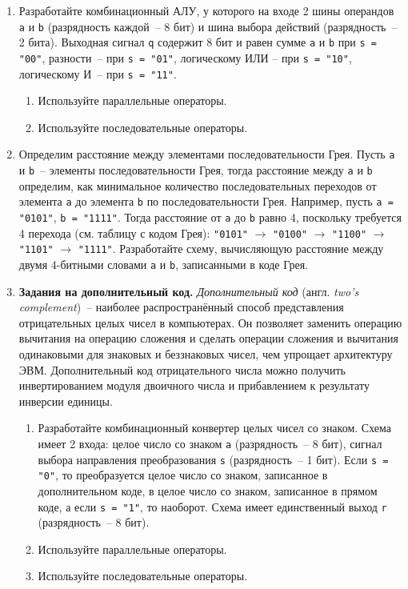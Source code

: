 \begin{enumerate}
\item Разработайте комбинационный АЛУ, у которого на входе 2 шины операндов \lstinline?a? и \lstinline?b? (разрядность каждой~-- 8 бит) и шина выбора действий (разрядность~-- 2 бита). Выходная сигнал \lstinline?q? содержит 8 бит и равен сумме \lstinline?a? и \lstinline?b? при \lstinline?s = "00"?, разности~-- при \lstinline?s = "01"?, логическому ИЛИ – при \lstinline?s = "10"?, логическому И~-- при \lstinline?s = "11"?.
    \begin{enumerate}
    \item Используйте параллельные операторы.
    \item Используйте последовательные операторы.
    \end{enumerate}
\item Определим расстояние между элементами последовательности Грея. Пусть \lstinline?a? и \lstinline?b?~-- элементы последовательности Грея, тогда расстояние между \lstinline?a? и \lstinline?b? определим, как минимальное количество последовательных переходов от элемента \lstinline?a? до элемента \lstinline?b? по последовательности Грея. Например, пусть \lstinline?a = "0101"?, \lstinline?b = "1111"?. Тогда расстояние от \lstinline?a? до \lstinline?b? равно 4, поскольку требуется 4 перехода (см. таблицу с кодом Грея): \lstinline?"0101"? $\rightarrow$ \lstinline?"0100"? $\rightarrow$ \lstinline?"1100"? $\rightarrow$ \lstinline?"1101"? $\rightarrow$ \lstinline?"1111"?. Разработайте схему, вычисляющую расстояние между двумя 4-битными словами \lstinline?a? и \lstinline?b?, записанными в коде Грея.
\item \textbf{Задания на дополнительный код.} \emph{Дополнительный код} (англ. \emph{two’s complement})~-- наиболее распространённый способ представления отрицательных целых чисел в компьютерах. Он позволяет заменить операцию вычитания на операцию сложения и сделать операции сложения и вычитания одинаковыми для знаковых и беззнаковых чисел, чем упрощает архитектуру ЭВМ. Дополнительный код отрицательного числа можно получить инвертированием модуля двоичного числа и прибавлением к результату инверсии единицы. 
    \begin{enumerate}
    \item Разработайте комбинационный конвертер целых чисел со знаком. Схема имеет 2 входа: целое число со знаком \lstinline?a? (разрядность~-- 8 бит), сигнал выбора направления преобразования \lstinline?s? (разрядность~-- 1 бит). Если \lstinline?s = "0"?, то преобразуется целое число со знаком, записанное в дополнительном коде, в целое число со знаком, записанное в прямом коде, а если \lstinline?s = "1"?, то наоборот. Схема имеет единственный выход \lstinline?r? (разрядность~-- 8 бит).
    \item Используйте параллельные операторы.
    \item Используйте последовательные операторы.
    \end{enumerate}
\end{enumerate}
